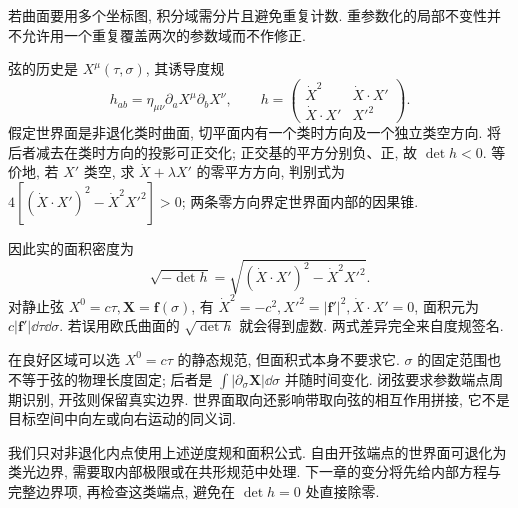 若曲面要用多个坐标图, 积分域需分片且避免重复计数. 重参数化的局部不变性并不允许用一个重复覆盖两次的参数域而不作修正.

弦的历史是 $X^\mu(\tau,\sigma)$, 其诱导度规
\[
 h_{ab}=\eta_{\mu\nu}\partial_aX^\mu\partial_bX^\nu,
 \qquad h=\begin{pmatrix}\dot X^2&\dot X\cdot X'\\
 \dot X\cdot X'&X'^2\end{pmatrix}.
\]
假定世界面是非退化类时曲面, 切平面内有一个类时方向及一个独立类空方向. 将后者减去在类时方向的投影可正交化; 正交基的平方分别负、正, 故 $\det h<0$. 等价地, 若 $X'$ 类空, 求 $\dot X+\lambda X'$ 的零平方方向, 判别式为
$4[(\dot X\cdot X')^2-\dot X^2X'^2]>0$; 两条零方向界定世界面内部的因果锥.

因此实的面积密度为
\[
 \sqrt{-\det h}
 =\sqrt{(\dot X\cdot X')^2-\dot X^2X'^2}.
\]
对静止弦 $X^0=c\tau,\boldsymbol X=\boldsymbol f(\sigma)$,
有 $\dot X^2=-c^2,X'^2=|\boldsymbol f'|^2,\dot X\cdot X'=0$, 面积元为 $c|\boldsymbol f'|\dd\tau\dd\sigma$. 若误用欧氏曲面的 $\sqrt{\det h}$ 就会得到虚数. 两式差异完全来自度规签名.

\begin{center}
\end{center}

在良好区域可以选 $X^0=c\tau$ 的静态规范, 但面积式本身不要求它. $\sigma$ 的固定范围也不等于弦的物理长度固定; 后者是 $\int|\partial_\sigma\boldsymbol X|\dd\sigma$ 并随时间变化. 闭弦要求参数端点周期识别, 开弦则保留真实边界. 世界面取向还影响带取向弦的相互作用拼接, 它不是目标空间中向左或向右运动的同义词.

我们只对非退化内点使用上述逆度规和面积公式. 自由开弦端点的世界面可退化为类光边界, 需要取内部极限或在共形规范中处理. 下一章的变分将先给内部方程与完整边界项, 再检查这类端点, 避免在 $\det h=0$ 处直接除零.

